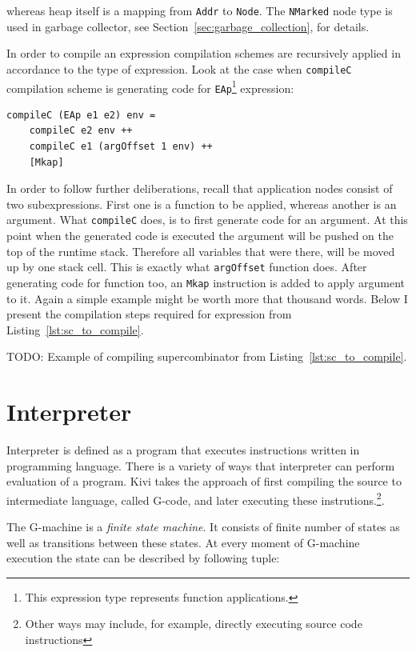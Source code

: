 \documentclass[12pt,a4paper]{report}
\begin{document}
whereas heap itself is a mapping from \texttt{Addr} to \texttt{Node}. The
\texttt{NMarked} node type is used in garbage collector, see
Section~\ref{sec:garbage_collection}, for details.

In order to compile an expression compilation schemes are recursively applied
in accordance to the type of expression. Look at the case when
\texttt{compileC} compilation scheme is generating code for
\texttt{EAp}\footnote{This expression type represents function applications.}
expression:

\vspace*{0.2in}
\begin{lstlisting}[style=haskell]
compileC (EAp e1 e2) env =
    compileC e2 env ++
    compileC e1 (argOffset 1 env) ++
    [Mkap]
\end{lstlisting}

In order to follow further deliberations, recall that application nodes consist
of two subexpressions. First one is a function to be applied, whereas another
is an argument. What \texttt{compileC} does, is to first generate code for an
argument. At this point when the generated code is executed the argument will
be pushed on the top of the runtime stack. Therefore all variables that were
there, will be moved up by one stack cell. This is exactly what
\texttt{argOffset} function does. After generating code for function too, an
\texttt{Mkap} instruction is added to apply argument to it. Again a simple
example might be worth more that thousand words. Below I present the
compilation steps required for expression from Listing~\ref{lst:sc_to_compile}.


TODO: Example of compiling supercombinator from Listing~\ref{lst:sc_to_compile}.


\section{Interpreter}
\label{sec:interpreter}
Interpreter is defined as a program that executes instructions written in
programming language. There is a variety of ways that interpreter can perform
evaluation of a program. Kivi takes the approach of first compiling the source
to intermediate language, called G-code, and later executing these
instrutions.\footnote{Other ways may include, for example, directly executing
source code instructions}.

The G-machine is a \textit{finite state machine}. It consists of finite number
of states as well as transitions between these states. At every moment of
G-machine execution the state can be described by following tuple:
\end{document}
